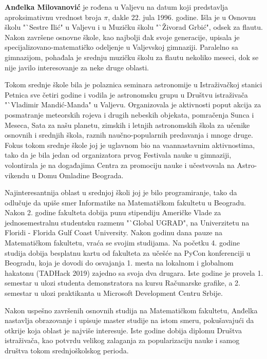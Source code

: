 \documentclass[12pt,oneside]{memoir}
\begin{document}
\begin{biografija}
%

  \textbf{Anđelka Milovanović} je rođena u Valjevu na datum koji predstavlja aproksimativnu vrednost broja $\pi$, dakle 22. jula 1996. godine. Išla je u Osnovnu školu "`Sestre Ilić" u Valjevu i u Muzičku školu "`Živorad Grbić", odsek za flautu. Nakon završene osnovne škole, kao najbolji đak svoje generacije, upisala je specijalizovano-matematičko odeljenje u Valjevskoj gimnaziji. Paralelno sa gimnazijom, pohađala je srednju muzičku školu za flautu nekoliko meseci, dok se nije javilo interesovanje za neke druge oblasti. 
  
  Tokom srednje škole bila je polaznica seminara astronomije u Istraživačkoj stanici Petnica sve četiri godine i vodila je astronomsku grupu u Društvu istraživača "`Vladimir Mandić-Manda" u Valjevu. Organizovala je aktivnosti poput akcija za posmatranje meteorskih rojeva i drugih nebeskih objekata, pomračenja Sunca i Meseca, Sata za našu planetu, zimskih i letnjih astronomskih škola za učenike osnovnih i srednjih škola, raznih naučno-popularnih predavanja i mnoge druge. Fokus tokom srednje škole joj je uglavnom bio na vaannastavnim aktivnostima, tako da je bila jedan od organizatora prvog Festivala nauke u gimnaziji, volontirala je na događajima Centra za promociju nauke i učestvovala na Astro-vikendu u Domu Omladine Beograda. 
  
  Najinteresantnija oblast u srednjoj školi joj je bilo programiranje, tako da odlučuje da upiše smer Informatike na Matematičkom fakultetu u Beogradu. Nakon 2. godine fakulteta dobija punu stipendiju Američke Vlade za jednosemestralnu studentsku razmenu "`Global UGRAD", na Univerzitetu na Floridi - Florida Gulf Coast University. Nakon godinu dana pauze na Matematičkom fakultetu, vraća se svojim studijama. Na početku 4. godine studija dobija besplatnu kartu od fakulteta za učešće na PyCon konferenciji u Beogradu, koja je dovodi do osvajanja 1. mesta na lokalnom i globalnom hakatonu (TADHack 2019) zajedno sa svoja dva drugara. Iste godine je provela 1. semestar u ulozi studenta demonstratora na kursu Računarske grafike, a 2. semestar u ulozi praktikanta u Microsoft Development Centru Srbije.    
  
  Nakon uspešno završenih osnovnih studija na Matematičkom fakultetu, Anđelka nastavlja obrazovanje i upisuje master studije na istom smeru, pokušavajući da otkrije koja oblast je najviše interesuje. Iste godine dobija diplomu Društva istraživača, kao potvrdu velikog zalaganja za popularizaciju nauke i samog društva tokom srednjoškolskog perioda. 
%
\end{biografija}
\end{document}
